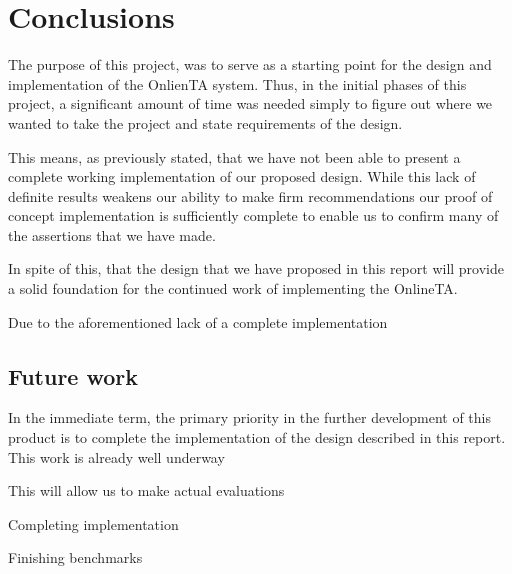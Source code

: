 \chapter{Conclusions}
The purpose of this project, was to serve as a starting point for the
design and implementation of the OnlienTA system. Thus, in the initial
phases of this project, a significant amount of time was needed simply
to figure out where we wanted to take the project and state
requirements of the design.

This means, as previously stated, that we have not been able to
present a complete working implementation of our proposed
design. While this lack of definite results weakens our ability to
make firm recommendations our proof of concept implementation is
sufficiently complete to enable us to confirm many of the
assertions that we have made.

In spite of this, that the design that we have proposed in this report will
provide a solid foundation for the continued work of implementing the
OnlineTA.


Due to the aforementioned lack of a complete implementation





\section{Future work}
In the immediate term, the primary priority in the further development
of this product is to complete the implementation of the design
described in this report. This work is already well underway 


This will allow us to make actual
evaluations

Completing implementation

Finishing benchmarks



